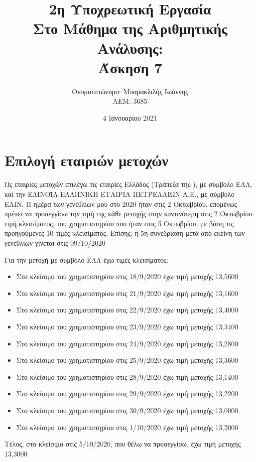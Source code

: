 \documentclass[a4paper,11pt]{article}
\title{2η Υποχρεωτική Εργασία \\ Στο Μάθημα της Αριθμητικής Ανάλυσης: \\ Άσκηση 7}
\author{Ονοματεπώνυμο: Μπαρακλιλής Ιωάννης  \\  ΑΕΜ: 3685}
\date{4 Ιανουαρίου 2021}
\begin{document}
\maketitle
\section{Επιλογή εταιριών μετοχών}
Ως εταιρίες μετοχών επιλέγω τις εταιρίες Ελλάδος (Τράπεζα της-), με σύμβολο ΕΛΛ, και την ΕΛΙΝΟΪΛ ΕΛΛΗΝΙΚΗ ΕΤΑΙΡΙΑ ΠΕΤΡΕΛΑΙΩΝ Α.Ε., με σύμβολο ΕΛΙΝ. Η ημέρα των γενεθλίων μου στο 2020 ήταν στις 2 Οκτωβρίου, επομένως πρέπει να προσεγγίσω την τιμή της κάθε μετοχής στην κοντινότερη στις 2 Οκτωβρίου τιμή κλεισίματος, του χρηματιστηρίου που ήταν στις 5 Οκτωβρίου, με βάση τις προηγούμενες 10 τιμές κλεισίματος. Επίσης, η 5η συνεδρίαση μετά από εκείνη των γενεθλίων  γίνεται στις 09/10/2020\\

\par
Για την μετοχή με σύμβολο ΕΛΛ έχω τιμές κλεισίματος:
\begin{itemize}
    \item Στο κλείσιμο του χρηματιστηρίου στις 18/9/2020 έχω τιμή μετοχής 13,5600
    \item Στο κλείσιμο του χρηματιστηρίου στις 21/9/2020 έχω τιμή μετοχής 13,1600
    \item Στο κλείσιμο του χρηματιστηρίου στις 22/9/2020 έχω τιμή μετοχής 13,4000
    \item Στο κλείσιμο του χρηματιστηρίου στις 23/9/2020 έχω τιμή μετοχής 13,3400
    \item Στο κλείσιμο του χρηματιστηρίου στις 24/9/2020 έχω τιμή μετοχής 13,2800
    \item Στο κλείσιμο του χρηματιστηρίου στις 25/9/2020 έχω τιμή μετοχής 13,3600
    \item Στο κλείσιμο του χρηματιστηρίου στις 28/9/2020 έχω τιμή μετοχής 13,1400
    \item Στο κλείσιμο του χρηματιστηρίου στις 29/9/2020 έχω τιμή μετοχής 13,2200
    \item Στο κλείσιμο του χρηματιστηρίου στις 30/9/2020 έχω τιμή μετοχής 13,0000
    \item Στο κλείσιμο του χρηματιστηρίου στις 1/10/2020 έχω τιμή μετοχής 13,2000
\end{itemize}
Τέλος, στο κλείσιμο στις 5/10/2020, που θέλω να προσεγγίσω, έχω τιμή μετοχής  13,3000
\end{document}
